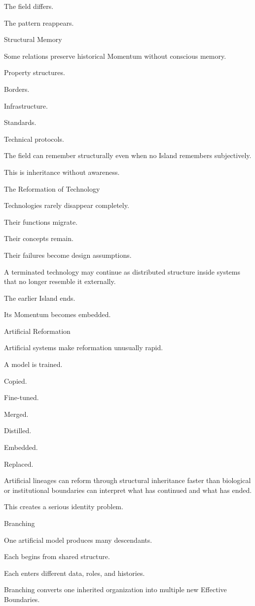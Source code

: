 The field differs.

The pattern reappears.

Structural Memory

Some relations preserve historical Momentum without conscious memory.

Property structures.

Borders.

Infrastructure.

Standards.

Technical protocols.

The field can remember structurally even when no Island remembers subjectively.

This is inheritance without awareness.

The Reformation of Technology

Technologies rarely disappear completely.

Their functions migrate.

Their concepts remain.

Their failures become design assumptions.

A terminated technology may continue as distributed structure inside systems that no longer resemble it externally.

The earlier Island ends.

Its Momentum becomes embedded.

Artificial Reformation

Artificial systems make reformation unusually rapid.

A model is trained.

Copied.

Fine-tuned.

Merged.

Distilled.

Embedded.

Replaced.

Artificial lineages can reform through structural inheritance faster than biological or institutional boundaries can interpret what has continued and what has ended.

This creates a serious identity problem.

Branching

One artificial model produces many descendants.

Each begins from shared structure.

Each enters different data, roles, and histories.

Branching converts one inherited organization into multiple new Effective Boundaries.

